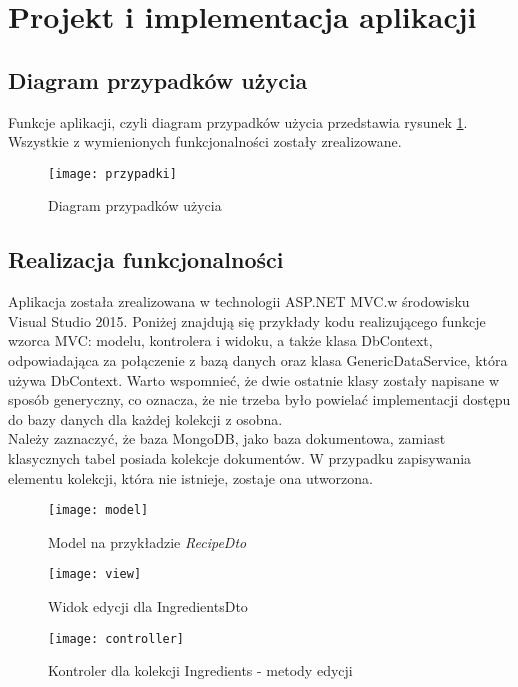\section{Projekt i implementacja aplikacji}

\subsection{Diagram przypadków użycia}

Funkcje aplikacji, czyli diagram przypadków użycia przedstawia rysunek \ref{rys:przypadki}. Wszystkie z wymienionych funkcjonalności zostały zrealizowane.

\begin{figure}[H]
	\centering
	\texttt{[image: przypadki]}
	\caption{Diagram przypadków użycia}
	\label{rys:przypadki}
\end{figure}



\subsection{Realizacja funkcjonalności}

Aplikacja została zrealizowana w technologii ASP.NET MVC.w środowisku Visual Studio 2015. Poniżej znajdują się przykłady kodu realizującego funkcje wzorca MVC: modelu, kontrolera i widoku, a także klasa DbContext, odpowiadająca za połączenie z bazą danych oraz klasa GenericDataService, która używa DbContext. Warto wspomnieć, że dwie ostatnie klasy zostały napisane w sposób generyczny, co oznacza, że nie trzeba było powielać implementacji dostępu do bazy danych dla każdej kolekcji z osobna.\\
Należy zaznaczyć, że baza MongoDB, jako baza dokumentowa, zamiast klasycznych tabel posiada kolekcje dokumentów. W przypadku zapisywania elementu kolekcji, która nie istnieje, zostaje ona utworzona.

\begin{figure}[H]
	\centering
	\texttt{[image: model]}
	\caption{Model na przykładzie \textit{RecipeDto}}
	\label{rys:model}
\end{figure}

\begin{figure}[H]
	\centering
	\texttt{[image: view]}
	\caption{Widok edycji dla IngredientsDto}
	\label{rys:view}
\end{figure}

\begin{figure}[H]
	\centering
	\texttt{[image: controller]}
	\caption{Kontroler dla kolekcji Ingredients - metody edycji}
	\label{rys:controller}
\end{figure}

